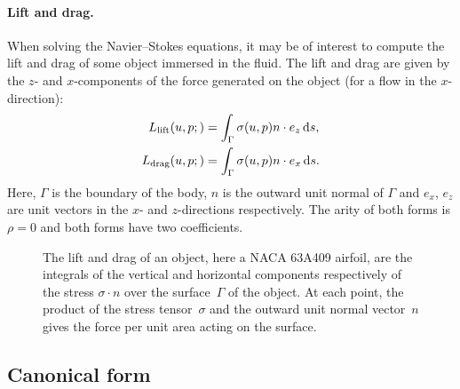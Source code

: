 \paragraph{Lift and drag.}

When solving the Navier--Stokes equations, it may be of interest to
compute the lift and drag of some object immersed in the fluid. The
lift and drag are given by the $z$- and $x$-components of the force
generated on the object (for a flow in the $x$-direction):
\begin{equation}
  \begin{split}
    L_{\mathrm{lift}}(u, p;) &= \int_{\Gamma} \sigma(u, p) n \cdot e_z \, \mathrm{d}s, \\
    L_{\mathrm{drag}}(u, p;) &= \int_{\Gamma} \sigma(u, p) n \cdot e_x \, \mathrm{d}s.
  \end{split}
\end{equation}
Here, $\Gamma$ is the boundary of the body, $n$ is the outward
unit normal of $\Gamma$ and $e_x$, $e_z$ are unit vectors
in the $x$- and $z$-directions respectively. The arity of both forms
is $\rho = 0$ and both forms have two coefficients.

\begin{figure}
\bwfig
  \centering
{}
  \caption{The lift and drag of an object, here a NACA 63A409
      airfoil, are the integrals of the vertical and horizontal
      components respectively of the stress $\sigma \cdot n$ over the
      surface~$\Gamma$ of the object. At each point, the product of
      the stress tensor~$\sigma$ and the outward unit normal
      vector~$n$ gives the force per unit area acting on the
      surface.}
\vspace*{-10pt}
\end{figure}

\enlargethispage{12pt}

\vspace*{-6pt}\subsection{Canonical form}

